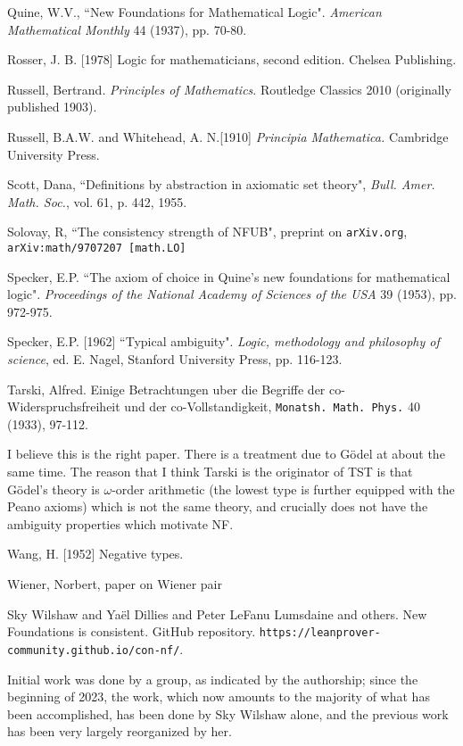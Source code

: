 \documentclass[112pt]{article}
\begin{document}
\begin{thebibliography}{99}
  Quine, W.V.,
``New Foundations for Mathematical Logic". 
{\em American Mathematical Monthly\/} 44 (1937), pp. 70-80. 

  Rosser, J. B. [1978] 
Logic for mathematicians, second edition. 
Chelsea Publishing.

  Russell, Bertrand.  {\em Principles of Mathematics\/}.  Routledge Classics 2010 (originally published 1903).

  Russell, B.A.W. and Whitehead, A. N.[1910]
{\em Principia Mathematica.\/} Cambridge University Press. 

  Scott, Dana, ``Definitions by abstraction in axiomatic set theory",  {\em Bull. Amer. Math.
Soc.}, vol. 61, p. 442, 1955.

  Solovay, R, ``The consistency strength of NFUB",  preprint on {\tt arXiv.org}, {\tt arXiv:math/9707207 [math.LO]}

  Specker, E.P.
``The axiom of choice in Quine's new foundations for mathematical logic". 
{\em Proceedings of the National Academy of Sciences of the USA\/} 39 (1953), pp. 972-975.

  Specker, E.P. [1962] 
``Typical ambiguity". 
{\em Logic, methodology and philosophy of science\/}, ed. E. Nagel, Stanford University Press, pp. 116-123.

  Tarski, Alfred.  Einige Betrachtungen uber die Begriffe der co-Widerspruchsfreiheit und der co-Vollstandigkeit,
{\tt Monatsh. Math. Phys.\/} 40 (1933), 97-112. 

I believe this is the right paper.  There is a treatment due to G\"odel at about the same time.  The reason that I think Tarski is the originator of TST is that G\"odel's theory is $\omega$-order arithmetic (the lowest type is further equipped with the Peano axioms) which is not the same theory, and crucially does not have the ambiguity properties which motivate NF.

  Wang, H. [1952] 
Negative types.

  Wiener, Norbert, paper on Wiener pair

  Sky Wilshaw and Yaël Dillies and Peter LeFanu Lumsdaine and others. New Foundations is consistent. GitHub repository. {\tt https://leanprover-community.github.io/con-nf/}.

Initial work was done by a group, as indicated by the authorship;  since the beginning of 2023, the work, which now amounts to the majority of what has been accomplished, has been done by Sky Wilshaw alone, and the previous work has been very largely reorganized by her.


\end{thebibliography}
\end{document}
